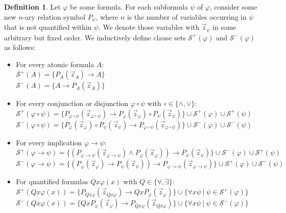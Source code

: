 \documentclass[a4paper,11pt]{report}
\theoremstyle{definition}
\theoremstyle{definition}
\theoremstyle{definition}
\theoremstyle{definition}
\theoremstyle{definition}
\newtheorem{definition}[theorem]{Definition}
\theoremstyle{definition}
\theoremstyle{definition}
\begin{document}
	\begin{definition}\label{def:tseytin}
		Let $\varphi$ be some formula. For each subformula $\psi$ of $\varphi$, consider some new $n$-ary relation symbol $P_\psi$, where $n$ is the number of variables occurring in $\psi$ that is not quantified within $\psi$. We denote those variables with $\vec z_\psi$ in some arbitrary but fixed order. We inductively define clause sets $\mathcal S^+(\varphi)$ and $\mathcal S^-(\varphi)$ as follows:
		\begin{itemize}
			\item For every atomic formula $A$:\\
			$\mathcal S^+(A) = \{P_A(\vec z_A)\to A\}$\\$\mathcal S^-(A) = \{A\to P_A(\vec z_A)\}$
			\item For every conjunction or disjunction $\varphi\circ\psi$ with $\circ\in\{\wedge,\vee\}$:\\
			$\mathcal S^+(\varphi\circ\psi) = \{P_{\varphi\circ\psi}(\vec z_{\varphi\circ\psi})\to P_{\varphi}(\vec z_\varphi)\circ P_{\psi}(\vec z_\psi)\}\cup \mathcal S^+(\varphi)\cup \mathcal S^+(\psi)$\\$\mathcal S^-(\varphi\circ\psi) =\{P_{\varphi}(\vec z_\varphi)\circ P_{\psi}(\vec z_\psi)\to P_{\varphi\circ\psi}(\vec z_{\varphi\circ\psi})\}\cup \mathcal S^-(\varphi)\cup \mathcal S^-(\psi)$
			\item For every implication $\varphi \to\psi$:\\
			$\mathcal S^+(\varphi\to\psi) = \{(P_{\varphi\to\psi}(\vec z_{\varphi\to\psi})\wedge P_{\varphi}(\vec z_\varphi))\to P_{\psi}(\vec z_\psi)\}\cup \mathcal S^-(\varphi)\cup \mathcal S^+(\psi)$\\$\mathcal S^-(\varphi\to\psi)  = \{(P_{\varphi}(\vec z_\varphi)\to P_{\psi}(\vec z_\psi))\to P_{\varphi\to\psi}(\vec z_{\varphi\to\psi})\}\cup \mathcal S^+(\varphi)\cup \mathcal S^-(\psi)$
			\item For quantified formulas $Qx\varphi(x)$ with $Q\in \{\forall,\exists\}$:\\
			$\mathcal S^+(Qx\varphi(x)) = \{P_{Qx\varphi}(\vec z_{Qx\varphi})\to QxP_{\varphi}(\vec z_{\varphi})\}\cup \{\forall x\psi\:|\:\psi\in\mathcal S^+(\varphi)\}$\\$\mathcal S^-(Qx\varphi(x))  = \{QxP_{\varphi}(\vec z_{\varphi})\to P_{Qx\varphi}(\vec z_{Qx\varphi})\}\cup \{\forall x\psi\:|\:\psi\in\mathcal S^-(\varphi)\}$
		\end{itemize}
	\end{definition}
	
\end{document}
